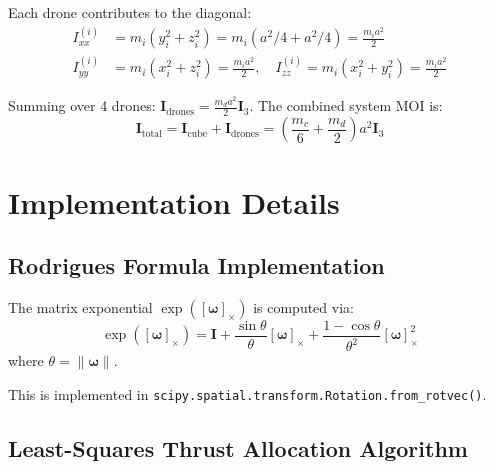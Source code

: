 \documentclass[12pt,a4paper]{article}
\begin{document}
Each drone contributes to the diagonal:
\begin{align}
    I_{xx}^{(i)} &= m_i(y_i^2 + z_i^2) = m_i(a^2/4 + a^2/4) = \frac{m_i a^2}{2} \\
    I_{yy}^{(i)} &= m_i(x_i^2 + z_i^2) = \frac{m_i a^2}{2}, \quad I_{zz}^{(i)} = m_i(x_i^2 + y_i^2) = \frac{m_i a^2}{2}
\end{align}

Summing over 4 drones: $\mathbf{I}_{\text{drones}} = \frac{m_d a^2}{2} \mathbf{I}_3$. The combined system MOI is:
\begin{equation}
    \mathbf{I}_{\text{total}} = \mathbf{I}_{\text{cube}} + \mathbf{I}_{\text{drones}} = \left(\frac{m_c}{6} + \frac{m_d}{2}\right) a^2 \mathbf{I}_3
\end{equation}

\section{Implementation Details}
\label{app:implementation}

\subsection{Rodrigues Formula Implementation}

The matrix exponential $\exp([\boldsymbol{\omega}]_\times)$ is computed via:
\begin{equation}
    \exp([\boldsymbol{\omega}]_\times) = \mathbf{I} + \frac{\sin\theta}{\theta}[\boldsymbol{\omega}]_\times + \frac{1-\cos\theta}{\theta^2}[\boldsymbol{\omega}]_\times^2
\end{equation}
where $\theta = \|\boldsymbol{\omega}\|$.

This is implemented in \texttt{scipy.spatial.transform.Rotation.from\_rotvec()}.

\subsection{Least-Squares Thrust Allocation Algorithm}
\end{document}
